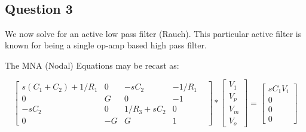 \documentclass[11pt]{article}
\begin{document}
    \begin{center}
    \end{center}
    { \hspace*{\fill} \\}
    
    \begin{center}
    \end{center}
    { \hspace*{\fill} \\}
    
    \begin{center}
    \end{center}
    { \hspace*{\fill} \\}
    
    \begin{center}
    \end{center}
    { \hspace*{\fill} \\}
    
    \hypertarget{question-3}{%
\subsection{Question 3}\label{question-3}}

We now solve for an active low pass filter (Rauch). This particular
active filter is known for being a single op-amp based high pass filter.

The MNA (Nodal) Equations may be recast as:

\[
\begin{bmatrix}
   s(C_1+C_2) + 1/R_1& 0& -sC_2& -1/R_1\\   
   0& G& 0 &-1\\
   -sC_2& 0& 1/R_3 + sC_2& 0&\\
   0& -G& G& 1&
   \end{bmatrix}
   *
   \begin{bmatrix} V_1 \\ V_p \\ V_m\\ V_o \end{bmatrix}
   =
   \begin{bmatrix} sC_1V_i\\ 0\\ 0\\ 0 \end{bmatrix}
\]
\end{document}
